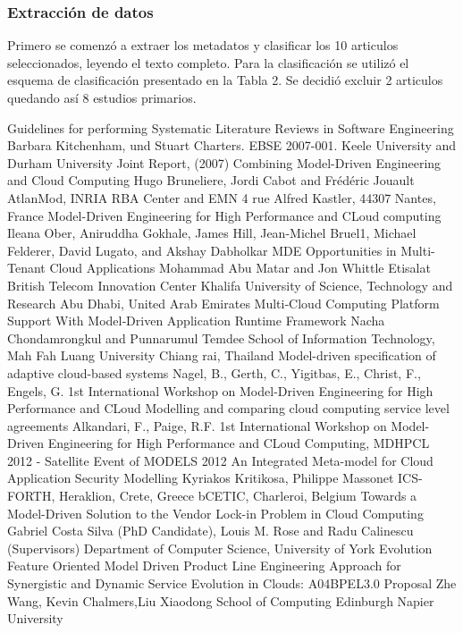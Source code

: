 \documentclass{llncs}
\begin{document}
\subsubsection{Extracción de datos}
Primero se comenzó a extraer los metadatos y clasificar los 10 articulos seleccionados, leyendo el texto completo. Para la clasificación se utilizó el esquema de clasificación presentado en la Tabla 2. Se decidió excluir 2 articulos quedando así 8 estudios primarios.

\begin{thebibliography}{1}
Guidelines for performing Systematic Literature Reviews in Software Engineering
Barbara Kitchenham, und Stuart Charters. EBSE 2007-001. Keele University and Durham University Joint Report, (2007)
Combining Model-Driven Engineering and Cloud Computing
Hugo Bruneliere, Jordi Cabot and Frédéric Jouault AtlanMod, INRIA RBA Center and EMN
4 rue Alfred Kastler, 44307 Nantes, France
\bibitem{}
Model-Driven Engineering for High Performance and CLoud computing
Ileana Ober, Aniruddha Gokhale, James Hill, Jean-Michel Bruel1, Michael Felderer, David Lugato, and Akshay Dabholkar
\bibitem{}
MDE Opportunities in Multi-Tenant Cloud Applications
Mohammad Abu Matar and Jon Whittle
Etisalat British Telecom Innovation Center Khalifa University of Science, Technology and Research Abu Dhabi, United Arab Emirates
\bibitem{}
Multi‐Cloud Computing Platform Support
With Model‐Driven Application Runtime Framework
Nacha Chondamrongkul and Punnarumul Temdee
School of Information Technology, Mah Fah Luang University Chiang rai, Thailand
\bibitem{}
Model-driven specification of adaptive cloud-based systems
Nagel, B., Gerth, C., Yigitbas, E., Christ, F., Engels, G.
 1st International Workshop on Model-Driven Engineering for High Performance and CLoud
\bibitem{}
Modelling and comparing cloud computing service level agreements
Alkandari, F., Paige, R.F.
 1st International Workshop on Model-Driven Engineering for High Performance and CLoud
Computing, MDHPCL 2012 - Satellite Event of MODELS 2012
\bibitem{}
An Integrated Meta-model for Cloud Application Security Modelling
Kyriakos Kritikosa, Philippe Massonet
ICS-FORTH, Heraklion, Crete, Greece bCETIC, Charleroi, Belgium
\bibitem{}
Towards a Model-Driven Solution to the Vendor
Lock-in Problem in Cloud Computing
Gabriel Costa Silva (PhD Candidate), Louis M. Rose and Radu Calinescu (Supervisors)
Department of Computer Science, University of York
\bibitem{}
Evolution Feature Oriented Model Driven
Product Line Engineering Approach for
Synergistic and Dynamic Service
Evolution in Clouds:
A04BPEL3.0 Proposal
Zhe Wang, Kevin Chalmers,Liu Xiaodong
School of Computing
Edinburgh Napier University
\end{thebibliography}
\end{document}
